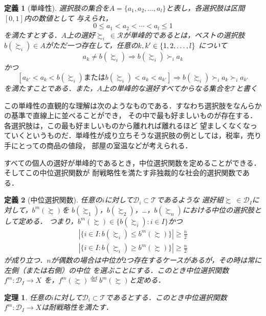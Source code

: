 \documentclass[dvipdfmx]{jsarticle}
\newtheorem*{THeorem}{定理}
\newtheorem*{DEfinition}{定義}
\begin{document}
\begin{DEfinition}[単峰性]
  選択肢の集合を$A = \{a_1, a_2, \ldots, a_{l}\}$と表し，各選択肢は区間$[0,1]$内の数値として
  与えられ，
  \[
    0 \leq a_1 < a_2 < \cdots < a_{l} \leq 1
  \]
  を満たすとする．$A$上の選好$\succsim_i \ \in \mathcal{R}$が単峰的であるとは，ベストの選択肢
  $b(\succsim_i) \in A$がただ一つ存在して，任意の$k, k' \in \{ 1, 2, \ldots, \mathnormal{l} \}$
  について
  \[
    a_k \neq b(\succsim_i) \Rightarrow b(\succsim_i) \succ_i a_k
  \]
  かつ
  \[
    [a_{k'} < a_{k} < b(\succsim_i) \text{または} b(\succsim_i) < a_{k} < a_{k'}]
    \Rightarrow b(\succsim_i) \succ_i a_{k} \succ_i a_{k'}
  \]
  を満たすことである．また，$A$上の単峰的な選好すべてからなる集合を$\mathcal{T}$と書く
\end{DEfinition}

この単峰性の直観的な理解は次のようなものである．すなわち選択肢をなんらかの基準で直線上に並べることができ，
その中で最も好ましいものが存在する．各選択肢は，この最も好ましいものから離れれば離れるほど
望ましくなくなっていくというものだ．単峰性が成り立ちそうな選択肢の例としては，税率，売り手にとっての商品の値段，
部屋の室温などが考えられる．

すべての個人の選好が単峰的であるとき，中位選択関数を定めることができる．そしてこの中位選択関数が
耐戦略性を満たす非独裁的な社会的選択関数である．

\begin{DEfinition}[中位選択関数]
  任意の$i$に対して$\mathcal{D}_i \subset \mathcal{T}$であるような
  選好組$\succsim \ \in \mathcal{D}_I$に対して，$b^m(\succsim)$を
  $b(\succsim_1)$，$b(\succsim_2)$，\ldots，$b(\succsim_n)$における中位の選択肢として定める．
  つまり，$b^m(\succsim) \in \{ b(\succsim_i):i \in I \}$かつ
  \begin{eqnarray*}
    | \{i \in I: b(\succsim_i) \leq b^m(\succsim) \} | \geq \frac{n}{2} \\
    | \{i \in I: b(\succsim_i) \geq b^m(\succsim) \} | \geq \frac{n}{2}
  \end{eqnarray*}
  が成り立つ．$n$が偶数の場合は中位が$2$つ存在するケースがあるが，その時は常に左側（または右側）の中位
  を選ぶことにする．このとき中位選択関数$f^m\colon \mathcal{D}_{I} \to X$
  を，$f^m(\succsim) \stackrel{\mathrm{def}}{=} b^m(\succsim)$と定める．
\end{DEfinition}

\begin{THeorem}
  任意の$i$に対して$\mathcal{D}_i \subset \mathcal{T}$であるとする．このとき中位選択関数
  $f^m\colon \mathcal{D}_I \to X$は耐戦略性を満たす．
\end{THeorem}
\end{document}
